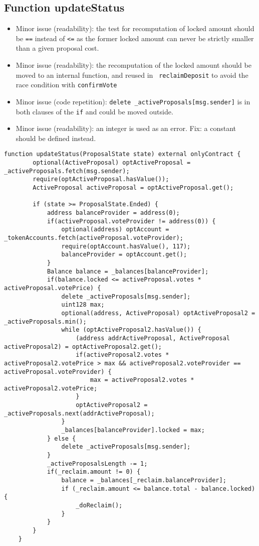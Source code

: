 \subsection{Function updateStatus}

\begin{itemize}
\item Minor issue (readability): the test for recomputation of locked
  amount should be {\tt ==} instead of {\tt <=} as the former
  locked amount can never be strictly smaller than a given proposal
  cost.
\item Minor issue (readability): the recomputation of the locked
  amount should be moved to an internal function, and reused in {\tt
    reclaimDeposit} to avoid the race condition with {\tt confirmVote}
\item Minor issue (code repetition): {\tt delete
  \_activeProposals[msg.sender]} is in both clauses of the {\tt if}
  and could be moved outside.
\item Minor issue (readability): an integer is used as an error. Fix:
  a constant should be defined instead.
\end{itemize}

\begin{lstlisting}[firstnumber=149]
    function updateStatus(ProposalState state) external onlyContract {
        optional(ActiveProposal) optActiveProposal = _activeProposals.fetch(msg.sender);
        require(optActiveProposal.hasValue());
        ActiveProposal activeProposal = optActiveProposal.get();

        if (state >= ProposalState.Ended) {
            address balanceProvider = address(0);
            if(activeProposal.voteProvider != address(0)) {
                optional(address) optAccount = _tokenAccounts.fetch(activeProposal.voteProvider);
                require(optAccount.hasValue(), 117);
                balanceProvider = optAccount.get();
            }
            Balance balance = _balances[balanceProvider];
            if(balance.locked <= activeProposal.votes * activeProposal.votePrice) {
                delete _activeProposals[msg.sender];
                uint128 max;
                optional(address, ActiveProposal) optActiveProposal2 = _activeProposals.min();
                while (optActiveProposal2.hasValue()) {
                    (address addrActiveProposal, ActiveProposal activeProposal2) = optActiveProposal2.get();
                    if(activeProposal2.votes * activeProposal2.votePrice > max && activeProposal2.voteProvider == activeProposal.voteProvider) {
                        max = activeProposal2.votes * activeProposal2.votePrice;
                    }
                    optActiveProposal2 = _activeProposals.next(addrActiveProposal);
                }
                _balances[balanceProvider].locked = max;
            } else {
                delete _activeProposals[msg.sender];
            }
            _activeProposalsLength -= 1;
            if(_reclaim.amount != 0) {
                balance = _balances[_reclaim.balanceProvider];
                if (_reclaim.amount <= balance.total - balance.locked) {
                    _doReclaim();
                }
            }
        }
    }
\end{lstlisting}

